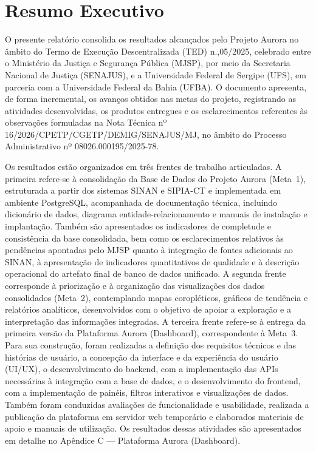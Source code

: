 \documentclass[11pt,a4paper]{article}
\begin{document}
\vfill

\clearpage
{}
\renewcommand{\contentsname}{Sumário}
{\sffamily\tableofcontents}
\clearpage
{}

\section{Resumo Executivo}
\label{sec:resumo}

O presente relatório consolida os resultados alcançados pelo Projeto Aurora no âmbito do Termo de Execução Descentralizada (TED) n.,05/2025, celebrado entre o Ministério da Justiça e Segurança Pública (MJSP), por meio da Secretaria Nacional de Justiça (SENAJUS), e a Universidade Federal de Sergipe (UFS), em parceria com a Universidade Federal da Bahia (UFBA). O documento apresenta, de forma incremental, os avanços obtidos nas metas do projeto, registrando as atividades desenvolvidas, os produtos entregues e os esclarecimentos referentes às observações formuladas na Nota Técnica nº 16/2026/CPETP/CGETP/DEMIG/SENAJUS/MJ, no âmbito do Processo Administrativo nº 08026.000195/2025-78.

Os resultados estão organizados em três frentes de trabalho articuladas. A primeira refere-se à consolidação da Base de Dados do Projeto Aurora (Meta~1), estruturada a partir dos sistemas SINAN e SIPIA-CT e implementada em ambiente PostgreSQL, acompanhada de documentação técnica, incluindo dicionário de dados, diagrama entidade-relacionamento e manuais de instalação e implantação. Também são apresentados os indicadores de completude e consistência da base consolidada, bem como os esclarecimentos relativos às pendências apontadas pelo MJSP quanto à integração de fontes adicionais ao SINAN, à apresentação de indicadores quantitativos de qualidade e à descrição operacional do artefato final de banco de dados unificado. A segunda frente corresponde à priorização e à organização das visualizações dos dados consolidados (Meta~2), contemplando mapas coropléticos, gráficos de tendência e relatórios analíticos, desenvolvidos com o objetivo de apoiar a exploração e a interpretação das informações integradas. A terceira frente refere-se à entrega da primeira versão da Plataforma Aurora (Dashboard), correspondente à Meta~3. Para sua construção, foram realizadas a definição dos requisitos técnicos e das histórias de usuário, a concepção da interface e da experiência do usuário (UI/UX), o desenvolvimento do backend, com a implementação das APIs necessárias à integração com a base de dados, e o desenvolvimento do frontend, com a implementação de painéis, filtros interativos e visualizações de dados. Também foram conduzidas avaliações de funcionalidade e usabilidade, realizada a publicação da plataforma em servidor web temporário e elaborados materiais de apoio e manuais de utilização. Os resultados dessas atividades são apresentados em detalhe no Apêndice C — Plataforma Aurora (Dashboard).
\end{document}
